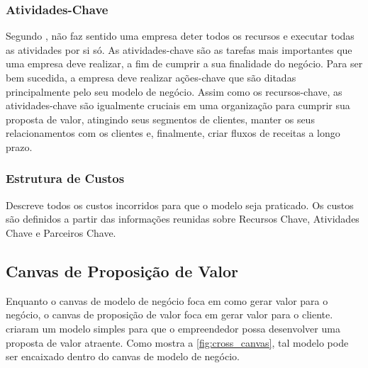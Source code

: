 \subsubsection{Atividades-Chave}
\label{cha:atividades_chave}
Segundo , não faz sentido uma empresa deter todos os recursos e executar todas as atividades por si só. As atividades-chave são as tarefas mais importantes que uma empresa deve realizar, a fim de cumprir a sua finalidade do negócio. Para ser bem sucedida, a empresa deve realizar ações-chave que são ditadas principalmente pelo seu modelo de negócio. Assim como os recursos-chave, as atividades-chave são igualmente cruciais em uma organização para cumprir sua proposta de valor, atingindo seus segmentos de clientes, manter os seus relacionamentos com os clientes e, finalmente, criar fluxos de receitas a longo prazo.

\subsubsection{Estrutura de Custos}
\label{cha:estrutura_de_custos}
Descreve todos os custos incorridos para que o modelo seja praticado. Os custos são definidos a partir das informações reunidas sobre Recursos Chave, Atividades Chave e Parceiros Chave. \cite{businessmodel}

\subsection{Canvas de Proposição de Valor}
\label{cha:canvas_de_proposicao_de_valor}
Enquanto o canvas de modelo de negócio foca em como gerar valor para o negócio, o canvas de proposição de valor foca em gerar valor para o cliente.
 criaram um modelo simples para que o empreendedor possa desenvolver uma proposta de valor atraente. Como mostra a \autoref{fig:cross_canvas}, tal modelo pode ser encaixado dentro do canvas de modelo de negócio. 

